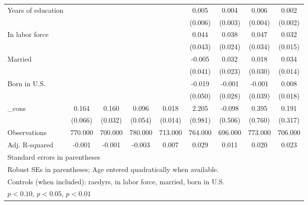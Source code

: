 \begin{table}[htbp]
\begin{tabular}{l*{8}{c}}
Years of education&                  &                  &                  &                  &    0.005         &    0.004         &    0.006         &    0.002         \\
          &                  &                  &                  &                  &  (0.006)         &  (0.003)         &  (0.004)         &  (0.002)         \\
In labor force&                  &                  &                  &                  &    0.044         &    0.038         &    0.047         &    0.032\sym{**} \\
          &                  &                  &                  &                  &  (0.043)         &  (0.024)         &  (0.034)         &  (0.015)         \\
Married   &                  &                  &                  &                  &   -0.005         &    0.032         &    0.018         &    0.034\sym{**} \\
          &                  &                  &                  &                  &  (0.041)         &  (0.023)         &  (0.030)         &  (0.014)         \\
Born in U.S.&                  &                  &                  &                  &   -0.019         &   -0.001         &   -0.001         &    0.008         \\
          &                  &                  &                  &                  &  (0.050)         &  (0.028)         &  (0.039)         &  (0.018)         \\
\_cons    &    0.164\sym{**} &    0.160\sym{***}&    0.096\sym{*}  &    0.018         &    2.205\sym{**} &   -0.098         &    0.395         &    0.191         \\
          &  (0.066)         &  (0.032)         &  (0.054)         &  (0.014)         &  (0.981)         &  (0.506)         &  (0.760)         &  (0.317)         \\
\midrule
Observations&  770.000         &  700.000         &  780.000         &  713.000         &  764.000         &  696.000         &  773.000         &  706.000         \\
Adj. R-squared&   -0.001         &   -0.001         &   -0.003         &    0.007         &    0.029         &    0.011         &    0.020         &    0.023         \\
\bottomrule
\multicolumn{9}{l}{\footnotesize Standard errors in parentheses}\\
\multicolumn{9}{l}{\footnotesize Robust SEs in parentheses; Age entered quadratically when available.}\\
\multicolumn{9}{l}{\footnotesize Controls (when included): raedyrs, in labor force, married, born in U.S.}\\
\multicolumn{9}{l}{\footnotesize \sym{*} \(p<0.10\), \sym{**} \(p<0.05\), \sym{***} \(p<0.01\)}\\
\end{tabular}
\end{table}
